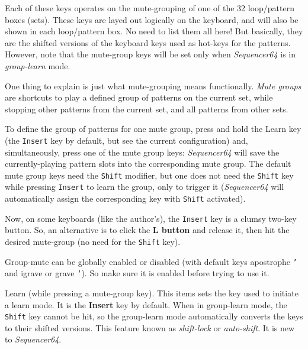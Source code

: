    Each of these keys operates on the mute-grouping of one of the 32
   loop/pattern boxes (sets).  These keys are layed out logically on the
   keyboard, and will also be shown in each loop/pattern box.  No need to list
   them all here!  But basically, they are the shifted versions of the
   keyboard keys used as hot-keys for the patterns.
   However, note that the mute-group keys will be set only when
   \textsl{Sequencer64} is in
    \textsl{group-learn} mode.

   One thing to explain is just what mute-grouping means functionally.
   \textsl{Mute groups} are shortcuts to play a defined group of patterns
   on the current set, while stopping other patterns from the current set, and
   all patterns from other sets.

   To define the group of patterns for one mute group, press and hold the Learn
   key (the \texttt{Insert} key by default, but see the current configuration)
   and, simultaneously, press one of the mute group keys: \textsl{Sequencer64}
   will save the currently-playing pattern slots into the corresponding mute
   group.  The default mute group keys need the \texttt{Shift}
   modifier, but one does not need the \texttt{Shift} key while pressing
   \texttt{Insert} to learn the group, only to trigger it
   (\textsl{Sequencer64} will automatically assign the corresponding key with
   \texttt{Shift} activated).

   Now, on some keyboards (like the author's), 
   the \texttt{Insert} key is a clumsy two-key button.  So, an alternative
   is to click the  \textbf{L button} and release it,
   then hit the desired mute-group (no need for the \texttt{Shift} key).

   Group-mute can be globally enabled or disabled (with default keys apostrophe
   \texttt{'}   and igrave or grave \texttt{`}).
   So make sure it is enabled before trying to use it.

   Learn (while pressing a mute-group key).
   This items sets the key used to initiate a learn mode.
   It is the \textbf{Insert} key by default.
   When in group-learn mode, the \texttt{Shift} key cannot be hit, so the
   group-learn mode automatically converts the keys to their shifted versions.
   This feature known as \textsl{shift-lock} or \textsl{auto-shift}.
   It is new to \textsl{Sequencer64}.

